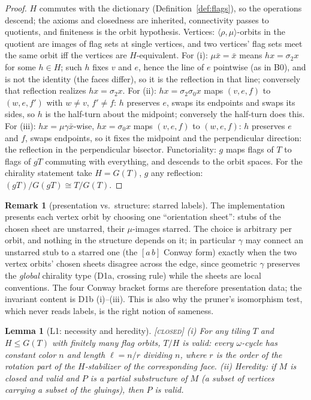\documentclass[11pt]{article}
\newtheorem{lemma}[theorem]{Lemma}
\theoremstyle{definition}
\newtheorem{remark}[theorem]{Remark}
\newcommand{\CLOSED}{\textnormal{\textsc{[closed]}}}
\begin{document}
\begin{proof}
$H$ commutes with the dictionary (Definition~\ref{def:flags}), so the operations descend;
the axioms and closedness are inherited, connectivity passes to quotients, and finiteness
is the orbit hypothesis. Vertices: $\langle\rho,\mu\rangle$-orbits in the quotient are
images of flag sets at single vertices, and two vertices' flag sets meet the same orbit
iff the vertices are $H$-equivalent. For (i): $\mu\bar x = \bar x$ means $hx = \sigma_2 x$
for some $h \in H$; such $h$ fixes $v$ and $e$, hence the line of $e$ pointwise (as in
B0), and is not the identity (the faces differ), so it is the reflection in that line;
conversely that reflection realizes $hx = \sigma_2x$. For (ii): $hx = \sigma_2\sigma_0 x$
maps $(v,e,f)$ to $(w,e,f')$ with $w \ne v$, $f' \ne f$: $h$ preserves $e$, swaps its
endpoints and swaps its sides, so $h$ is the half-turn about the midpoint; conversely the
half-turn does this. For (iii): $hx = \mu\gamma\bar x$-wise, $hx = \sigma_0x$ maps
$(v,e,f)$ to $(w,e,f)$: $h$ preserves $e$ and $f$, swaps endpoints, so it fixes the
midpoint and the perpendicular direction: the reflection in the perpendicular bisector.
Functoriality: $g$ maps flags of $T$ to flags of $gT$ commuting with everything, and
descends to the orbit spaces. For the chirality statement take $H = G(T)$,
$g$ any reflection: $(gT)/G(gT) \cong T/G(T)$.
\end{proof}

\begin{remark}[presentation vs.\ structure: starred labels]\label{rem:presentation}
The implementation presents each vertex orbit by choosing one ``orientation sheet'':
stubs of the chosen sheet are unstarred, their $\mu$-images starred. The choice is
arbitrary per orbit, and nothing in the structure depends on it; in particular
$\gamma$ may connect an unstarred stub to a starred one (the $[a\,b]$ Conway form)
exactly when the two vertex orbits' chosen sheets disagree across the edge, since
geometric $\gamma$ preserves the \emph{global} chirality type (D1a, crossing rule) while
the sheets are local conventions. The four Conway bracket forms are therefore
presentation data; the invariant content is D1b (i)--(iii). This is also why the pruner's
isomorphism test, which never reads labels, is the right notion of sameness.
\end{remark}

\begin{lemma}[L1: necessity and heredity]\label{lem:L1} \CLOSED\;
(i) For any tiling $T$ and $H \le G(T)$ with finitely many flag orbits, $T/H$ is valid:
every $\omega$-cycle has constant color $n$ and length $\ell = n/r$ dividing $n$, where
$r$ is the order of the rotation part of the $H$-stabilizer of the corresponding face.
(ii) Heredity: if $M$ is closed and valid and $P$ is a partial substructure of $M$ (a
subset of vertices carrying a subset of the gluings), then $P$ is valid.
\end{lemma}
\end{document}
